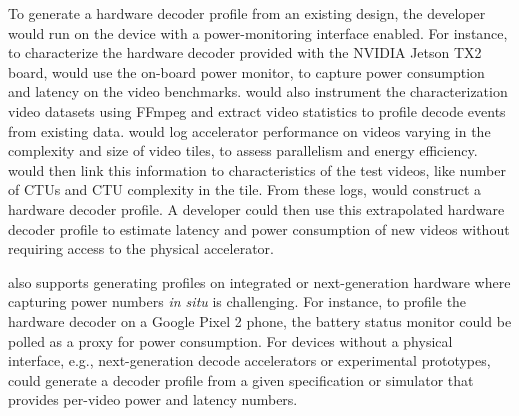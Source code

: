 \begin{table}[t]
  \centering
  \caption{Video Workloads Evaluated}
  \label{tab:workloads}
\end{table}

To generate a hardware decoder profile from an existing design, the developer would run \nameArchprof on the device with a power-monitoring interface enabled.
For instance, to characterize the hardware decoder provided with the NVIDIA Jetson TX2 board, \nameArchprof would use the on-board power monitor, to capture power consumption and latency on the video benchmarks.
\nameArchprof would also instrument the characterization video datasets using {FFmpeg}\cite{ffmpeg} and extract video statistics to profile decode events from existing data.
\nameArchprof would log accelerator performance on videos varying in the complexity and size of video tiles, to assess parallelism and energy efficiency.
\nameArchprof would then link this information to characteristics of the test videos, like number of CTUs and CTU complexity in the tile.
From these logs, \nameArchprof would construct a hardware decoder profile.
A developer could then use this extrapolated hardware decoder profile to estimate latency and power consumption of new videos without requiring access to the physical accelerator.

\nameArchprof also supports generating profiles on integrated or next-generation hardware where capturing power numbers \emph{in situ} is challenging.
For instance, to profile the hardware decoder on a Google Pixel 2 phone, the battery status monitor could be polled as a proxy for power consumption.
For devices without a physical interface, e.g., next-generation decode accelerators or experimental prototypes, \nameArchprof could generate a decoder profile from a given specification or simulator that provides per-video power and latency numbers.

